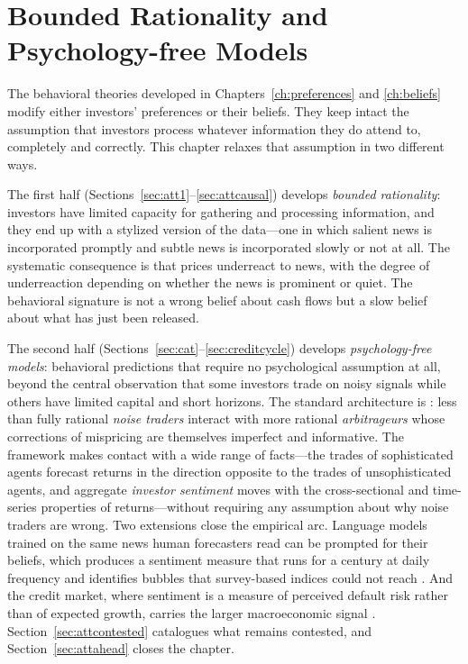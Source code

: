 \chapter{Bounded Rationality and Psychology-free Models}
\label{ch:bounded}

The behavioral theories developed in Chapters~\ref{ch:preferences} and \ref{ch:beliefs} modify either investors' preferences or their beliefs. They keep intact the assumption that investors process whatever information they do attend to, completely and correctly. This chapter relaxes that assumption in two different ways.

The first half (Sections~\ref{sec:att1}--\ref{sec:attcausal}) develops \emph{bounded rationality}: investors have limited capacity for gathering and processing information, and they end up with a stylized version of the data---one in which salient news is incorporated promptly and subtle news is incorporated slowly or not at all. The systematic consequence is that prices underreact to news, with the degree of underreaction depending on whether the news is prominent or quiet. The behavioral signature is not a wrong belief about cash flows but a slow belief about what has just been released.

The second half (Sections~\ref{sec:cat}--\ref{sec:creditcycle}) develops \emph{psychology-free models}: behavioral predictions that require no psychological assumption at all, beyond the central observation that some investors trade on noisy signals while others have limited capital and short horizons. The standard architecture is \citet{delong1990}: less than fully rational \emph{noise traders} interact with more rational \emph{arbitrageurs} whose corrections of mispricing are themselves imperfect and informative. The framework makes contact with a wide range of facts---the trades of sophisticated agents forecast returns in the direction opposite to the trades of unsophisticated agents, and aggregate \emph{investor sentiment} moves with the cross-sectional and time-series properties of returns---without requiring any assumption about why noise traders are wrong. Two extensions close the empirical arc. Language models trained on the same news human forecasters read can be prompted for their beliefs, which produces a sentiment measure that runs for a century at daily frequency and identifies bubbles that survey-based indices could not reach \citep{bybee2025}. And the credit market, where sentiment is a measure of perceived default risk rather than of expected growth, carries the larger macroeconomic signal \citep{krishnamurthy2025}. Section~\ref{sec:attcontested} catalogues what remains contested, and Section~\ref{sec:attahead} closes the chapter.

